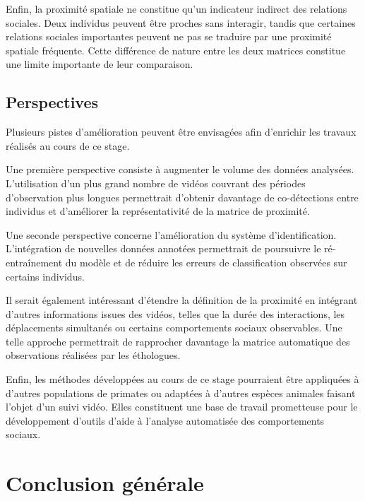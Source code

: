 \documentclass[11pt,a4paper]{report}
\begin{document}
Enfin, la proximité spatiale ne constitue qu'un indicateur indirect des
relations sociales. Deux individus peuvent être proches sans interagir,
tandis que certaines relations sociales importantes peuvent ne pas se
traduire par une proximité spatiale fréquente. Cette différence de nature
entre les deux matrices constitue une limite importante de leur
comparaison.

\section{Perspectives}

Plusieurs pistes d'amélioration peuvent être envisagées afin d'enrichir
les travaux réalisés au cours de ce stage.

Une première perspective consiste à augmenter le volume des données
analysées. L'utilisation d'un plus grand nombre de vidéos couvrant des
périodes d'observation plus longues permettrait d'obtenir davantage de
co-détections entre individus et d'améliorer la représentativité de la
matrice de proximité.

Une seconde perspective concerne l'amélioration du système
d'identification. L'intégration de nouvelles données annotées permettrait
de poursuivre le ré-entraînement du modèle et de réduire les erreurs de
classification observées sur certains individus.

Il serait également intéressant d'étendre la définition de la proximité
en intégrant d'autres informations issues des vidéos, telles que la
durée des interactions, les déplacements simultanés ou certains
comportements sociaux observables. Une telle approche permettrait de
rapprocher davantage la matrice automatique des observations réalisées
par les éthologues.

Enfin, les méthodes développées au cours de ce stage pourraient être
appliquées à d'autres populations de primates ou adaptées à d'autres
espèces animales faisant l'objet d'un suivi vidéo. Elles constituent une
base de travail prometteuse pour le développement d'outils d'aide à
l'analyse automatisée des comportements sociaux.

\chapter*{Conclusion générale}
\end{document}

